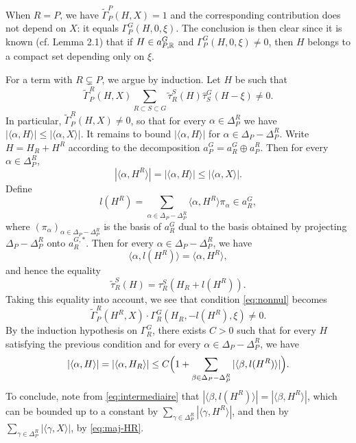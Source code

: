 \begin{paragr}
\begin{preuve}
When $R=P$, we have $\tilde{\Gamma}_P^P(H,X)=1$ and the corresponding contribution does not depend on $X$: it equals $\Gamma_P^G(H,0,\xi)$. The conclusion is then clear since it is known (cf. \cite{trace_inv} Lemma 2.1) that if $H\in a_{P,\mathbb{R}}^G$ and $\Gamma_P^G(H,0,\xi)\neq 0$, then $H$ belongs to a compact set depending only on $\xi$. 

For a term with $R\subsetneq P$, we argue by induction. Let $H$ be such that
\begin{equation}
  \label{eq:nonnul}
  \tilde{\Gamma}_P^R(H,X) \sum_{R\subset S\subset G }\tilde{\tau}_{R}^{S}(H) \hat{\tau}_S^G(H-\xi)\neq 0.
\end{equation}
In particular, $\tilde{\Gamma}_P^R(H,X)\neq 0$, so that for every $\alpha\in \Delta_P^R$ we have $|\langle \alpha,H\rangle| \leq |\langle \alpha,X\rangle|$. It remains to bound $|\langle \alpha,H\rangle|$ for $\alpha\in  \Delta_P-\Delta_P^R$. Write $H=H_R+H^R$ according to the decomposition $a_P^G=a_R^G\oplus a^R_P$. Then for every $\alpha\in \Delta_P^R$,
\begin{equation}
  \label{eq:maj-HR}
  |\langle \alpha,H^R\rangle|=|\langle \alpha,H\rangle| \leq |\langle \alpha,X\rangle|.
\end{equation}
Define
$$l(H^R)=\sum_{\alpha\in \Delta_P-\Delta_P^R} \langle \alpha, H^R\rangle \pi_\alpha\in a_R^G,$$
where $(\pi_\alpha)_{\alpha\in \Delta_P-\Delta_P^R}$ is the basis of $a_R^G$ dual to the basis obtained by projecting $\Delta_P-\Delta_P^R$ onto $a_R^{G,*}$. Then for every $\alpha\in \Delta_P-\Delta_P^R$, we have 
\begin{equation}
  \label{eq:intermediaire}
   \langle \alpha, l(H^R)\rangle=  \langle \alpha, H^R\rangle,
 \end{equation}
and hence the equality
$$\tilde{\tau}_{R}^{S}(H)=\tau_R^S(H_R+l(H^R)).$$
Taking this equality into account, we see that condition \eqref{eq:nonnul} becomes 
 $$\tilde{\Gamma}_P^R(H^R,X) \cdot \Gamma_R^G(H_R,-l(H^R),\xi)\neq 0.$$
By the induction hypothesis on $\Gamma_R^G$, there exists $C>0$ such that for every $H$ satisfying the previous condition and for every $\alpha\in  \Delta_P-\Delta_P^R$, we have 
$$|\langle \alpha, H\rangle |=|\langle \alpha, H_R\rangle |\leq C\Bigl(1+\sum_{\beta \in  \Delta_P-\Delta_P^R} |\langle \beta, l(H^R) \rangle|\Bigr).$$
To conclude, note from \eqref{eq:intermediaire} that $|\langle \beta, l(H^R) \rangle|= |\langle \beta, H^R \rangle|$, which can be bounded up to a constant by $\sum_{\gamma\in \Delta_P^R} | \langle \gamma, H^R\rangle  |$, and then by $\sum_{\gamma\in \Delta_P^R} | \langle \gamma, X\rangle  |$, by \eqref{eq:maj-HR}.
\end{preuve}
\end{paragr}  


